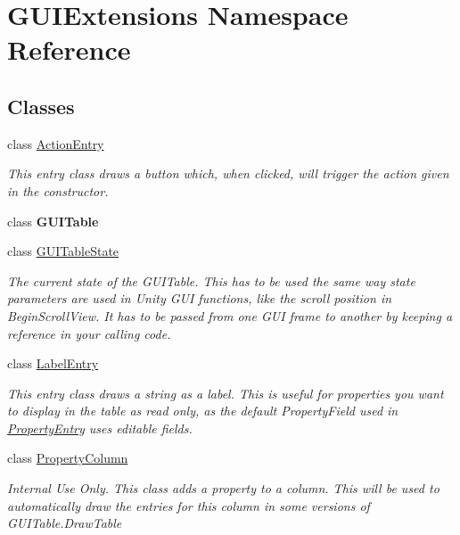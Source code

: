 \hypertarget{namespace_g_u_i_extensions}{}\section{G\+U\+I\+Extensions Namespace Reference}
\label{namespace_g_u_i_extensions}
\subsection*{Classes}
\begin{DoxyCompactItemize}
\item 
class \mbox{\hyperlink{class_g_u_i_extensions_1_1_action_entry}{Action\+Entry}}
\begin{DoxyCompactList}\small\item\em This entry class draws a button which, when clicked, will trigger the action given in the constructor. \end{DoxyCompactList}\item 
class {\bfseries G\+U\+I\+Table}
\item 
class \mbox{\hyperlink{class_g_u_i_extensions_1_1_g_u_i_table_state}{G\+U\+I\+Table\+State}}
\begin{DoxyCompactList}\small\item\em The current state of the G\+U\+I\+Table. This has to be used the same way state parameters are used in Unity G\+UI functions, like the scroll position in Begin\+Scroll\+View. It has to be passed from one G\+UI frame to another by keeping a reference in your calling code. \end{DoxyCompactList}\item 
class \mbox{\hyperlink{class_g_u_i_extensions_1_1_label_entry}{Label\+Entry}}
\begin{DoxyCompactList}\small\item\em This entry class draws a string as a label. This is useful for properties you want to display in the table as read only, as the default Property\+Field used in \mbox{\hyperlink{class_g_u_i_extensions_1_1_property_entry}{Property\+Entry}} uses editable fields. \end{DoxyCompactList}\item 
class \mbox{\hyperlink{class_g_u_i_extensions_1_1_property_column}{Property\+Column}}
\begin{DoxyCompactList}\small\item\em Internal Use Only. This class adds a property to a column. This will be used to automatically draw the entries for this column in some versions of G\+U\+I\+Table.\+Draw\+Table \end{DoxyCompactList}\item 

\end{DoxyCompactItemize}
